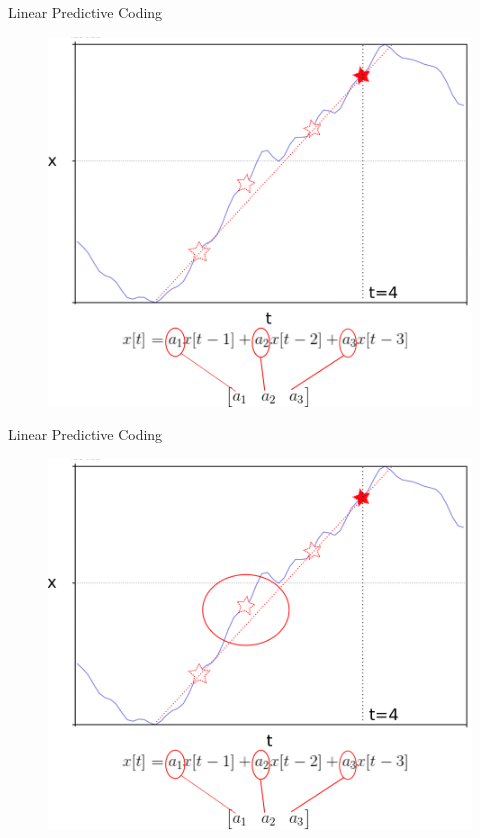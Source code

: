 \documentclass{beamer}
\begin{document}
\begin{frame}
Linear Predictive Coding
\begin{figure}
\includegraphics[scale=0.5]{store_coefs.png}
\end{figure}
\end{frame}
\begin{frame}
Linear Predictive Coding
\begin{figure}
\includegraphics[scale=0.5]{bad_prediction.png}
\end{figure}
\end{frame}
\end{document}
